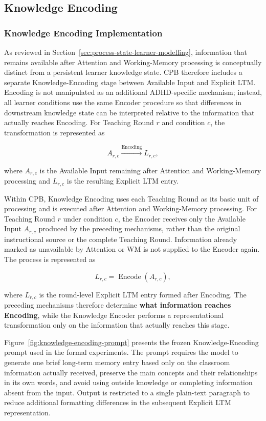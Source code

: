 \subsection{Knowledge Encoding}
\label{subsec:knowledge-encoding}

\subsubsection{Knowledge Encoding Implementation}
\label{sec:knowledge-encoding-implementation}

As reviewed in Section~\ref{sec:process-state-learner-modelling}, information that remains available after Attention and Working-Memory processing is conceptually distinct from a persistent learner knowledge state. CPB therefore includes a separate Knowledge-Encoding stage between Available Input and Explicit LTM. Encoding is not manipulated as an additional ADHD-specific mechanism; instead, all learner conditions use the same Encoder procedure so that differences in downstream knowledge state can be interpreted relative to the information that actually reaches Encoding. For Teaching Round $r$ and condition $c$, the transformation is represented as

\[
A_{r,c}
\xrightarrow{\mathrm{Encoding}}
L_{r,c},
\]

where $A_{r,c}$ is the Available Input remaining after Attention and Working-Memory processing and $L_{r,c}$ is the resulting Explicit LTM entry.

Within CPB, Knowledge Encoding uses each Teaching Round as its basic unit of processing and is executed after Attention and Working-Memory processing. For Teaching Round $r$ under condition $c$, the Encoder receives only the Available Input $A_{r,c}$ produced by the preceding mechanisms, rather than the original instructional source or the complete Teaching Round. Information already marked as unavailable by Attention or WM is not supplied to the Encoder again. The process is represented as

\[
L_{r,c}
=
\operatorname{Encode}(A_{r,c}),
\]

where $L_{r,c}$ is the round-level Explicit LTM entry formed after Encoding. The preceding mechanisms therefore determine \textbf{what information reaches Encoding}, while the Knowledge Encoder performs a representational transformation only on the information that actually reaches this stage.

Figure~\ref{fig:knowledge-encoding-prompt} presents the frozen Knowledge-Encoding prompt used in the formal experiments. The prompt requires the model to generate one brief long-term memory entry based only on the classroom information actually received, preserve the main concepts and their relationships in its own words, and avoid using outside knowledge or completing information absent from the input. Output is restricted to a single plain-text paragraph to reduce additional formatting differences in the subsequent Explicit LTM representation.

